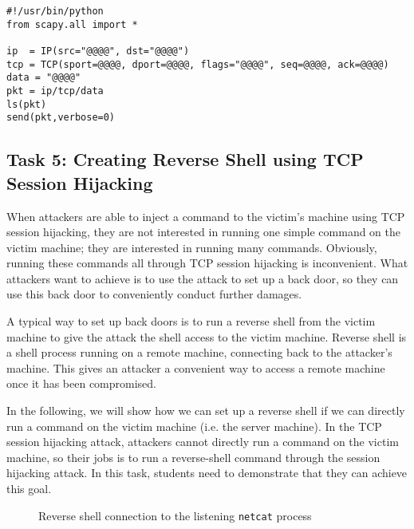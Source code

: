 \begin{lstlisting}
#!/usr/bin/python
from scapy.all import *

ip  = IP(src="@@@@", dst="@@@@")
tcp = TCP(sport=@@@@, dport=@@@@, flags="@@@@", seq=@@@@, ack=@@@@)
data = "@@@@"
pkt = ip/tcp/data
ls(pkt)
send(pkt,verbose=0)
\end{lstlisting}




\subsection{Task 5: Creating Reverse Shell using TCP Session Hijacking}

When attackers are able to inject a command to the victim's machine using
TCP session hijacking, they are not interested in running one simple
command on the victim machine; they are interested in running many
commands. Obviously, running these commands all through TCP session
hijacking is inconvenient. What attackers want to achieve is to use the
attack to set up a back door, so they can use this
back door to conveniently conduct further damages.

A typical way to set up back doors is to run a reverse shell from the
victim machine to give the attack the shell access to the victim machine.
Reverse shell is a shell process running on a remote machine, connecting
back to the attacker's machine. This gives an attacker a convenient way to
access a remote machine once it has been compromised. 


In the following, we will show how we can set up a reverse shell if we can
directly run a command on the victim machine (i.e. the server machine). 
In the TCP session hijacking attack, attackers cannot directly run a
command on the victim machine, so their jobs is to run a reverse-shell
command through the session hijacking attack. 
In this task, students need to demonstrate that they can achieve this goal.



\begin{figure}[htb]
\centering
{}
\caption{Reverse shell connection to the listening \texttt{netcat} process}
\label{tcp:fig:reverse_shell}
\end{figure}


